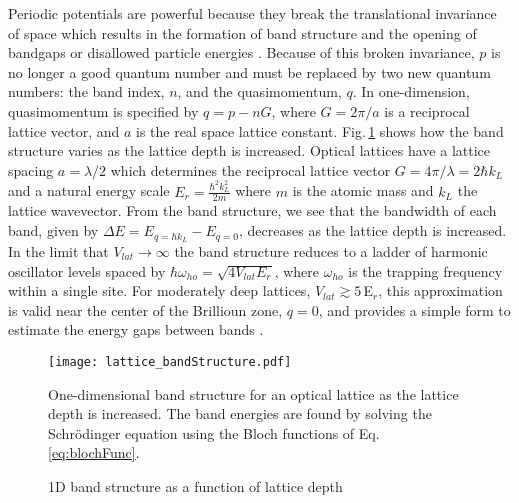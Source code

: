 Periodic potentials are powerful because they break the translational invariance of space which results in the formation of band structure and the opening of bandgaps or disallowed particle energies \cite{Ashcroft1976}.
Because of this broken invariance, $p$ is no longer a good quantum number and must be replaced by two new quantum numbers: the band index, $n$, and the quasimomentum, $q$.
In one-dimension, quasimomentum is specified by $q = p - nG$, where $G=2\pi/a$ is a reciprocal lattice vector, and $a$ is the real space lattice constant.
Fig.\,\ref{fig:bandStructure} shows how the band structure varies as the lattice depth is increased.
Optical lattices have a lattice spacing $a = \lambda /2$ which determines the reciprocal lattice vector $G = 4\pi / \lambda = 2 \hbar k_L$ and a natural energy scale $E_r = \frac{\hbar^2 k_L^2}{2m}$ where $m$ is the atomic mass and $k_L$ the lattice wavevector.
From the band structure, we see that the bandwidth of each band, given by $\Delta E = E_{q=\hbar k_L} - E_{q=0}$, decreases as the lattice depth is increased.
In the limit that $V_{lat}\!\rightarrow\!\infty$ the band structure reduces to a ladder of harmonic oscillator levels spaced by $\hbar \omega_{ho} = \sqrt{4 V_{lat} E_r}$, where $\omega_{ho}$ is the trapping frequency within a single site.
For moderately deep lattices, $V_{lat} \gtrsim 5\,$E$_r$, this approximation is valid near the center of the Brillioun zone, $q = 0$, and provides a simple form to estimate the energy gaps between bands \cite{Jaksch2005, jbc98,Jaksch2005}.
	\begin{figure} 
		\centerline{
		\texttt{[image: lattice\_bandStructure.pdf]}}
		\caption{1D band structure as a function of lattice depth}{One-dimensional band structure for an optical lattice as the lattice depth is increased. The band energies are found by solving the Schr\"{o}dinger equation using the Bloch functions of Eq.\,\ref{eq:blochFunc}.}
		\label{fig:bandStructure}
	\end{figure}

